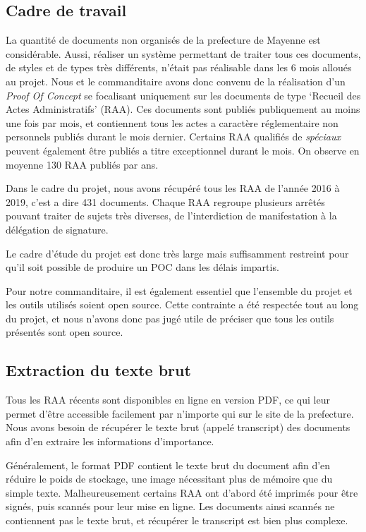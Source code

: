 
\subsection{Cadre de travail}
La quantité de documents non organisés de la prefecture de Mayenne est considérable.
Aussi, réaliser un système permettant de traiter tous ces documents, de styles et de types très différents, n'était pas réalisable dans les 6 mois alloués au projet.
Nous et le commanditaire avons donc convenu de la réalisation d'un \textit{Proof Of Concept} se focalisant uniquement sur les documents de type `Recueil des Actes Administratifs' (RAA).
Ces documents sont publiés publiquement au moins une fois par mois, et contiennent tous les actes a caractère réglementaire non personnels publiés durant le mois dernier.
Certains RAA qualifiés de \textit{spéciaux} peuvent également être publiés a titre exceptionnel durant le mois.
On observe en moyenne 130 RAA publiés par ans.

Dans le cadre du projet, nous avons récupéré tous les RAA de l'année 2016 à 2019, c'est a dire 431 documents.
Chaque RAA regroupe plusieurs arrêtés pouvant traiter de sujets très diverses, de l'interdiction de manifestation à la délégation de signature.

Le cadre d'étude du projet est donc très large mais suffisamment restreint pour qu'il soit possible de produire un POC dans les délais impartis. 

Pour notre commanditaire, il est également essentiel que l'ensemble du projet et les outils utilisés soient open source.
Cette contrainte a été respectée tout au long du projet, et nous n'avons donc pas jugé utile de préciser que tous les outils présentés sont open source.

\subsection{Extraction du texte brut}
Tous les RAA récents sont disponibles en ligne en version PDF, ce qui leur permet d'être accessible facilement par n'importe qui sur le site de la prefecture.
Nous avons besoin de récupérer le texte brut (appelé transcript) des documents afin d'en extraire les informations d'importance.

Généralement, le format PDF contient le texte brut du document afin d'en réduire le poids de stockage, une image nécessitant plus de mémoire que du simple texte.
Malheureusement certains RAA ont d'abord été imprimés pour être signés, puis scannés pour leur mise en ligne.
Les documents ainsi scannés ne contiennent pas le texte brut, et récupérer le transcript est bien plus complexe.


